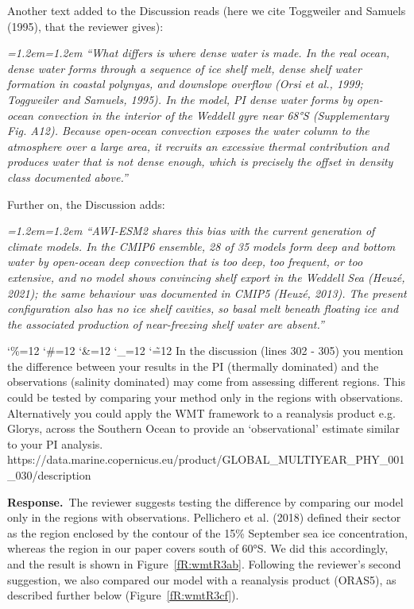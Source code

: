 \documentclass[11pt,a4paper]{article}
\newcommand{\comment}[1]{\par\medskip\noindent\color{black}\begingroup\catcode`\%=12 \catcode`\#=12 \catcode`\&=12 \catcode`\_=12 \catcode`\~=12 \commentbody}
\newcommand{\commentbody}[1]{#1\endgroup\par\smallskip}
\newcommand{\response}{\par\noindent\color{chgcol}\textbf{Response.}\ }
\newenvironment{change}{\par\smallskip\color{chgcol}\small\itshape\leftskip=1.2em\rightskip=1.2em\noindent\ignorespaces}{\par\smallskip}
\begin{document}
Another text added to the Discussion reads (here we cite Toggweiler and Samuels (1995), that the reviewer gives):

\begin{change}
``What differs is where dense water is made. In the real ocean, dense water forms through a sequence of ice shelf melt, dense shelf water formation in coastal polynyas, and downslope overflow (Orsi et al., 1999; Toggweiler and Samuels, 1995). In the model, PI dense water forms by open-ocean convection in the interior of the Weddell gyre near 68°S (Supplementary Fig. A12). Because open-ocean convection exposes the water column to the atmosphere over a large area, it recruits an excessive thermal contribution and produces water that is not dense enough, which is precisely the offset in density class documented above.''
\end{change}

Further on, the Discussion adds:

\begin{change}
``AWI-ESM2 shares this bias with the current generation of climate models. In the CMIP6 ensemble, 28 of 35 models form deep and bottom water by open-ocean deep convection that is too deep, too frequent, or too extensive, and no model shows convincing shelf export in the Weddell Sea (Heuzé, 2021); the same behaviour was documented in CMIP5 (Heuzé, 2013). The present configuration also has no ice shelf cavities, so basal melt beneath floating ice and the associated production of near-freezing shelf water are absent.''
\end{change}


\comment{R3}{In the discussion (lines 302 - 305) you mention the difference between your results in the PI (thermally dominated) and the observations (salinity dominated) may come from assessing different regions. This could be tested by comparing your method only in the regions with observations. Alternatively you could apply the WMT framework to a reanalysis product e.g. Glorys, across the Southern Ocean to provide an ‘observational’ estimate similar to your PI analysis. https://data.marine.copernicus.eu/product/GLOBAL\_MULTIYEAR\_PHY\_001\_030/description}

\response The reviewer suggests testing the difference by comparing our model only in the regions with observations. Pellichero et al. (2018) defined their sector as the region enclosed by the contour of the 15\% September sea ice concentration, whereas the region in our paper covers south of 60°S. We did this accordingly, and the result is shown in Figure~\ref{fR:wmtR3ab}. Following the reviewer's second suggestion, we also compared our model with a reanalysis product (ORAS5), as described further below (Figure~\ref{fR:wmtR3cf}).
\end{document}
